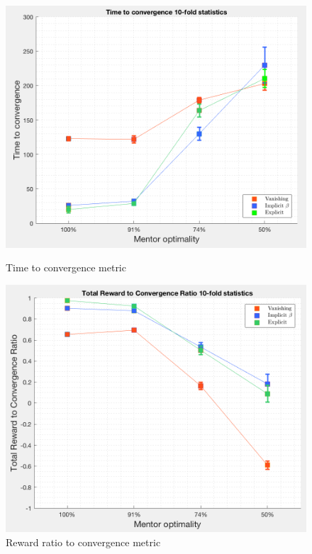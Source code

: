 \documentclass[a4paper]{report}
\begin{document}
{{{{				\begin{figure}[ht!]
					\begin{minipage}{0.5\linewidth}
						\includegraphics[width=\linewidth]{tt_metric}
						\caption{Time to convergence metric}
						\label{fig::metric_tt}
					\end{minipage}
					\begin{minipage}{0.5\linewidth}
						\includegraphics[width=\linewidth]{tr_metric}
						\caption{Reward ratio to convergence metric}
						\label{fig::metric_tr}
					\end{minipage}
				\end{figure}	
			}
		}
}}
\end{document}
